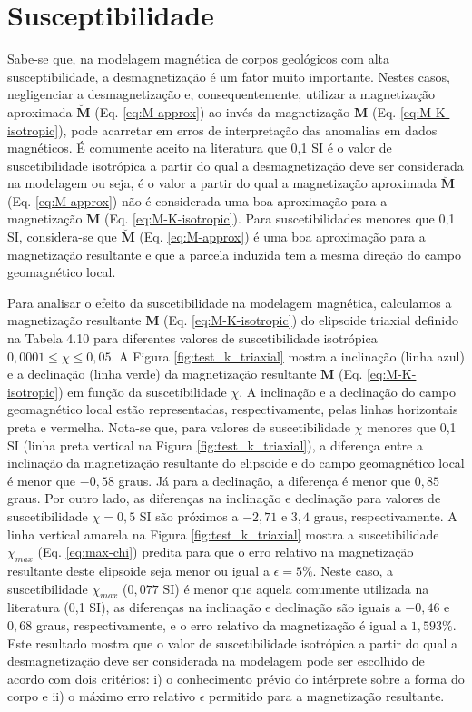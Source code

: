 \section{Susceptibilidade}

Sabe-se que, na modelagem magnética de corpos geológicos com alta susceptibilidade, a desmagnetização é um fator muito importante. Nestes casos, negligenciar a desmagnetização e, consequentemente, utilizar a magnetização aproximada $\breve{\mathbf{M}}$ (Eq. \ref{eq:M-approx}) ao invés da magnetização $\mathbf{M}$ (Eq. \ref{eq:M-K-isotropic}), pode acarretar em erros de interpretação das anomalias em dados magnéticos. É comumente aceito na literatura que 0,1 SI é o valor de suscetibilidade isotrópica a partir do qual a desmagnetização deve ser considerada na modelagem ou seja, é o valor a partir do qual a magnetização aproximada $\breve{\mathbf{M}}$ (Eq. \ref{eq:M-approx}) não é considerada uma boa aproximação para a magnetização $\mathbf{M}$ (Eq. \ref{eq:M-K-isotropic}). Para suscetibilidades menores que 0,1 SI, considera-se que $\breve{\mathbf{M}}$ (Eq. \ref{eq:M-approx}) é uma boa aproximação para a magnetização resultante e que a parcela induzida tem a mesma direção do campo geomagnético local.

Para analisar o efeito da suscetibilidade na modelagem magnética, calculamos a magnetização resultante $\mathbf{M}$ (Eq. \ref{eq:M-K-isotropic}) do elipsoide triaxial definido na Tabela 4.10 para diferentes valores de suscetibilidade isotrópica $0,0001 \le \chi \le 0,05$. A Figura \ref{fig:test_k_triaxial} mostra a inclinação (linha azul) e a declinação (linha verde) da magnetização resultante $\mathbf{M}$ (Eq. \ref{eq:M-K-isotropic}) em função da suscetibilidade $\chi$. A inclinação e a declinação do campo geomagnético local estão representadas, respectivamente, pelas linhas horizontais preta e vermelha. Nota-se que, para valores de suscetibilidade $\chi$ menores que 0,1 SI (linha preta vertical na Figura \ref{fig:test_k_triaxial}), a diferença entre a inclinação da magnetização resultante do elipsoide e do campo geomagnético local é menor que $-0,58$ graus. Já para a declinação, a diferença é menor que $0,85$ graus. Por outro lado, as diferenças na inclinação e declinação para valores de suscetibilidade $\chi = 0,5$ SI são próximos a $-2,71$ e $3,4$ graus, respectivamente. A linha vertical amarela na Figura \ref{fig:test_k_triaxial} mostra a suscetibilidade $\chi_{max}$ (Eq. \ref{eq:max-chi}) predita para que o erro relativo na magnetização resultante deste elipsoide seja menor ou igual a $\epsilon = 5\%$. Neste caso, a suscetibilidade $\chi_{max}$ ($0,077$ SI) é menor que aquela comumente utilizada na literatura (0,1 SI), as diferenças na inclinação e declinação são iguais a $-0,46$ e $0,68$ graus, respectivamente, e o erro relativo da magnetização é igual a $1,593\%$. Este resultado mostra que o valor de suscetibilidade isotrópica a partir do qual a desmagnetização deve ser considerada na modelagem pode ser escolhido de acordo com dois critérios: i) o conhecimento prévio do intérprete sobre a forma do corpo e ii) o máximo erro relativo $\epsilon$ permitido para a magnetização resultante.

